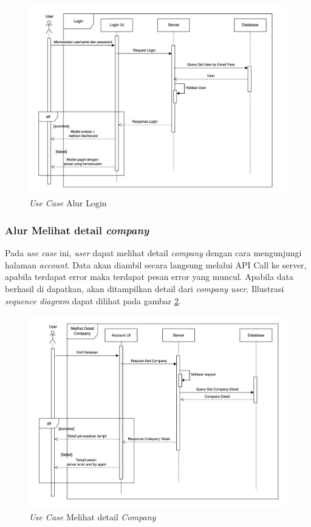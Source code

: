 \begin{figure}[ht]
  \centering
  \includegraphics[width=1\textwidth]{resources/chapter-3/usecase/uc-05.jpg}
  \caption{\textit{Use Case} Alur Login}
  \label{fig:usecase-05}
\end{figure}

\subsubsection{Alur Melihat detail \textit{company}}

Pada \textit{use case} ini, \textit{user} dapat melihat detail \textit{company} dengan cara mengunjungi halaman \textit{account}. Data akan diambil secara langsung melalui API Call ke server, apabila terdapat error maka terdapat pesan error yang muncul. Apabila data berhasil di dapatkan, akan ditampilkan detail dari \textit{company} \textit{user}. Illustrasi \textit{sequence diagram} dapat dilihat pada gambar \ref{fig:usecase-06}.

\begin{figure}[ht]
  \centering
  \includegraphics[width=1\textwidth]{resources/chapter-3/usecase/uc-06.jpg}
  \caption{\textit{Use Case} Melihat detail \textit{Company}}
  \label{fig:usecase-06}
\end{figure}

